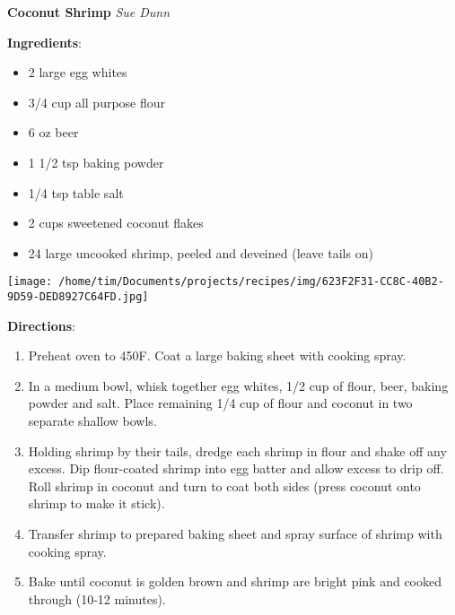 \documentclass[11pt, twoside, openany]{book}
\begin{document}
\noindent\begin{minipage}[t]{\linewidth}%
{\Large\textbf{Coconut Shrimp}} \label{coconut-shrimp}\hfill\textit{Sue Dunn}\\
\noindent\begin{minipage}[t]{0.78\linewidth}%
\textbf{Ingredients}:\vspace{-3mm}
\begin{multicols}{2}
\begin{itemize}\setlength\itemsep{-1mm}
\item 2 large egg whites
\item 3/4 cup all purpose flour
\item 6 oz beer
\item 1 1/2 tsp baking powder
\item 1/4 tsp table salt
\item 2 cups sweetened coconut flakes
\item 24 large uncooked shrimp, peeled and deveined (leave tails on)
\end{itemize}
\end{multicols}
\end{minipage}
\noindent\begin{minipage}[t]{0.18\linewidth}
\centering \strut\vspace*{-\baselineskip}\newline
\texttt{[image: /home/tim/Documents/projects/recipes/img/623F2F31-CC8C-40B2-9D59-DED8927C64FD.jpg]}\\
\end{minipage}\vspace{3mm}
\textbf{Directions}:
\vspace{-3mm}\begin{enumerate}\setlength\itemsep{-1mm}
\item Preheat oven to 450F. Coat a large baking sheet with cooking spray.
\item In a medium bowl, whisk together egg whites, 1/2 cup of flour, beer, baking powder and salt. Place remaining 1/4 cup of flour and coconut in two separate shallow bowls.
\item Holding shrimp by their tails, dredge each shrimp in flour and shake off any excess. Dip flour-coated shrimp into egg batter and allow excess to drip off. Roll shrimp in coconut and turn to coat both sides (press coconut onto shrimp to make it stick).
\item Transfer shrimp to prepared baking sheet and spray surface of shrimp with cooking spray.
\item Bake until coconut is golden brown and shrimp are bright pink and cooked through (10-12 minutes).
\end{enumerate}
\end{minipage}\vspace{8mm}
\end{document}
